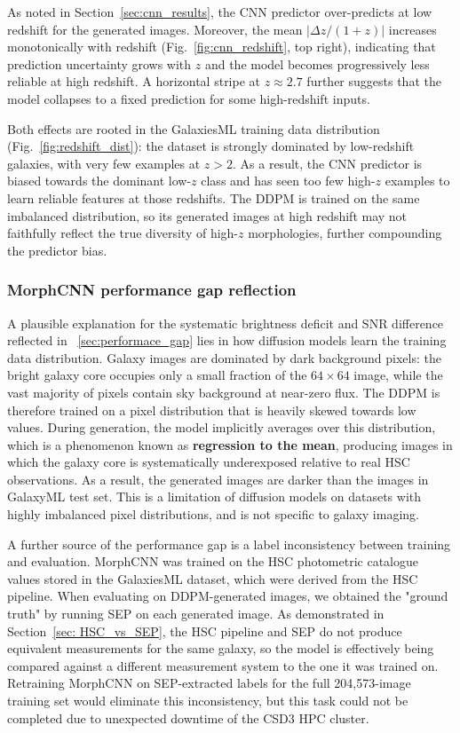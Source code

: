 \documentclass[fleqn,usenatbib]{mnras}
\begin{document}
As noted in Section~\ref{sec:cnn_results}, the CNN predictor
over-predicts at low redshift for the generated images.
Moreover, the mean $|\Delta z/(1+z)|$ increases monotonically with
redshift (Fig.~\ref{fig:cnn_redshift}, top right), indicating that
prediction uncertainty grows with $z$ and the model becomes
progressively less reliable at high redshift.
A horizontal stripe at $z \approx 2.7$ further suggests that the
model collapses to a fixed prediction for some high-redshift inputs.

Both effects are rooted in the GalaxiesML training data distribution
(Fig.~\ref{fig:redshift_dist}): the dataset is strongly dominated by
low-redshift galaxies, with very few examples at $z > 2$.
As a result, the CNN predictor is biased towards the dominant
low-$z$ class and has seen too few high-$z$ examples to learn
reliable features at those redshifts.
The DDPM is trained on the same imbalanced distribution, so its
generated images at high redshift may not faithfully reflect the
true diversity of high-$z$ morphologies, further compounding the
predictor bias.



\subsubsection{MorphCNN performance gap reflection}


A plausible explanation for the systematic brightness deficit and SNR difference reflected in ~\ref{sec:performace_gap} lies in
how diffusion models learn the training data distribution.
Galaxy images are dominated by dark background pixels: the bright
galaxy core occupies only a small fraction of the $64 \times 64$
image, while the vast majority of pixels contain sky background at
near-zero flux.
The DDPM is therefore trained on a pixel distribution that is
heavily skewed towards low values.
During generation, the model implicitly averages over this
distribution, which is a phenomenon known as \textbf{regression to the mean}, producing images in which the galaxy core is systematically
underexposed relative to real HSC observations. As a result, the generated images are darker than the images in GalaxyML test set.
This is a limitation of diffusion models on datasets with
highly imbalanced pixel distributions, and is not specific to galaxy
imaging.

A further source of the performance gap is a label inconsistency
between training and evaluation.
MorphCNN was trained on the HSC photometric catalogue values
stored
in the GalaxiesML dataset, which were derived from the HSC
pipeline.
When evaluating on DDPM-generated images, we obtained the "ground truth" by
running SEP on each generated image.
As demonstrated in Section~\ref{sec: HSC_vs_SEP}, the HSC pipeline
and SEP do not produce equivalent measurements for the same galaxy, so the model
is effectively being compared against a different measurement system
to the one it was trained on.
Retraining MorphCNN on SEP-extracted labels for the full
204,573-image training set would eliminate this inconsistency, but
this task could not be completed due to unexpected downtime of the
CSD3 HPC cluster.
\end{document}

